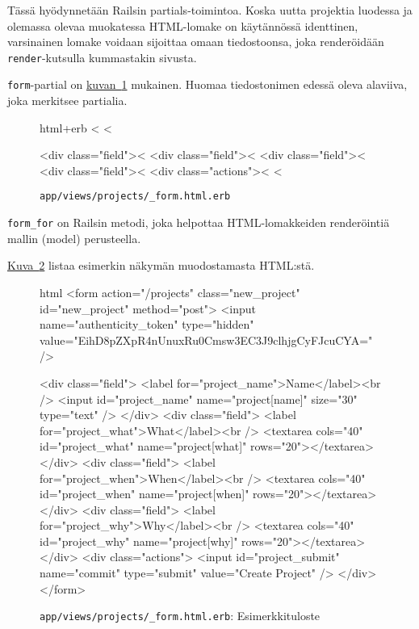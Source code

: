 \documentclass{article}
\newenvironment{myfigure}[1][tbp]{
  \begin{figure}[#1]
    \centering
    \begin{lrbox}{\myfigurebox}
      \begin{minipage}{\textwidth}
}{
      \end{minipage}
    \end{lrbox}
    \colorbox{blue!4}{\usebox{\myfigurebox}}
  \end{figure}
}
\newcommand{\myref}[2]{\hyperref[#2]{#1~\ref*{#2}}}
\newcommand{\pdfforeignlanguage}[2]{\texorpdfstring{\foreignlanguage{#1}{#2}}{#2}}
\newcommand{\eng}[1]{\pdfforeignlanguage{english}{#1}}
\begin{document}
Tässä hyödynnetään Railsin \eng{partials}-toimintoa. Koska uutta projektia
luodessa ja olemassa olevaa muokatessa HTML-lomake on käytännössä identtinen,
varsinainen lomake voidaan sijoittaa omaan tiedostoonsa, joka renderöidään
\texttt{render}-kutsulla kummastakin sivusta.

\begin{samepage}
\texttt{form}-\eng{partial} on \myref{kuvan}{fig:projects-form-partial-00}
mukainen. Huomaa tiedostonimen edessä oleva alaviiva, joka merkitsee partialia.

\begin{myfigure}[H]
\caption{\texttt{app/views/projects/\_form.html.erb}}
\label{fig:projects-form-partial-00}

\begin{pygmented}{html+erb}
<%
  <%

  <div class="field"><%
  <div class="field"><%
  <div class="field"><%
  <div class="field"><%
  <div class="actions"><%
<%
\end{pygmented}
\end{myfigure}
\end{samepage}

\texttt{form\_for} on Railsin metodi, joka helpottaa HTML-lomakkeiden
renderöintiä mallin (\eng{model}) perusteella.

\begin{samepage}
\myref{Kuva}{fig:projects-new-view-00-example} listaa esimerkin näkymän
muodostamasta HTML:stä.

\begin{myfigure}[H]
\caption{\texttt{app/views/projects/\_form.html.erb}: Esimerkkituloste}
\label{fig:projects-new-view-00-example}

\begin{pygmented}{html}
<form action="/projects" class="new_project" id="new_project" method="post">
  <input name="authenticity_token" type="hidden" value="EihD8pZXpR4nUnuxRu0Cmsw3EC3J9clhjgCyFJcuCYA=" />

  <div class="field">
    <label for="project_name">Name</label><br />
    <input id="project_name" name="project[name]" size="30" type="text" />
  </div>
  <div class="field">
    <label for="project_what">What</label><br />
    <textarea cols="40" id="project_what" name="project[what]" rows="20"></textarea>
  </div>
  <div class="field">
    <label for="project_when">When</label><br />
    <textarea cols="40" id="project_when" name="project[when]" rows="20"></textarea>
  </div>
  <div class="field">
    <label for="project_why">Why</label><br />
    <textarea cols="40" id="project_why" name="project[why]" rows="20"></textarea>
  </div>
  <div class="actions">
    <input id="project_submit" name="commit" type="submit" value="Create Project" />
  </div>
</form>
\end{pygmented}
\end{myfigure}
\end{samepage}
\end{document}
